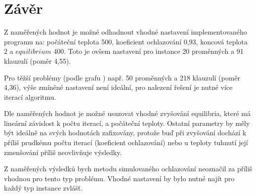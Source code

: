 \documentclass[10pt,a4paper]{article}
\begin{document}
\section{Závěr} 
Z naměřených hodnot je možné odhadnout vhodné nastavení implementovaného programu na: počáteční teplota 500, koeficient ochlazování 0,93, koncová teplota 2 a $equilibrium$ 400. Toto je ovšem nastavení pro instance 20 proměnných a 91 klauzulí (poměr 4,55). 

Pro těžší problémy (podle grafu ) např. 50 proměnných a 218 klauzulí (poměr 4,36), výše zmíněné nastavení není ideální, pro nalezení řešení je nutné více iterací algoritmu.

Dle naměřených hodnot je možné usuzovat vhodné zvyšování equilibria, které má lineární závislost k počtu iterací, a počáteční teploty. Ostatní parametry by měly být ideálně na svých hodnotách zafixovány, protože buď při zvyšování dochází k příliš prudkému počtu iterací (koeficient ochlazování) nebo u teploty tuhnutí její zmenšování příliš neovlivňuje výsledky.

Z naměřených výsledků bych metodu simulovaného ochlazování neoznačil za příliš vhodnou pro tento typ problému. Vhodné nastavení by bylo nutné najít pro každý typ instance zvlášť.
\end{document}
